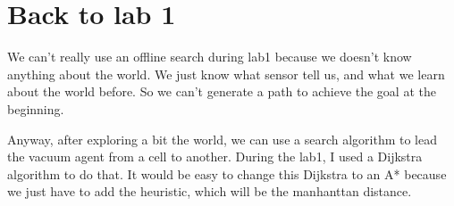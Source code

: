 \section{Back to lab 1}

We can't really use an offline search during lab1 because we doesn't know anything about the world. We just know what sensor tell us, and what we learn about the world before. So we can't generate a path to achieve the goal at the beginning.

Anyway, after exploring a bit the world, we can use a search algorithm to lead the vacuum agent from a cell to another. During the lab1, I used a Dijkstra algorithm to do that. It would be easy to change this Dijkstra to an A* because we just have to add the heuristic, which will be the manhanttan distance.


